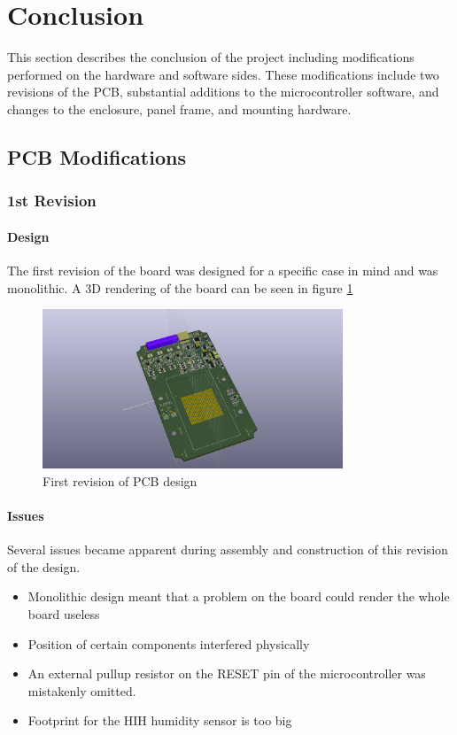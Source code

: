 \documentclass{article}
\numberwithin{figure}{section}
\numberwithin{equation}{section}
\begin{document}
{\section{Conclusion}\label{conclusion}
This section describes the conclusion of the project including modifications performed on the hardware and software sides. These modifications include two revisions of the PCB, substantial additions to the microcontroller software, and changes to the enclosure, panel frame, and mounting hardware.

\subsection{PCB Modifications}
\subsubsection{1st Revision}\label{conclusion-pcb-rev1}
\paragraph{Design}
The first revision of the board was designed for a specific case in mind and was monolithic. A 3D rendering of the board can be seen in figure \ref{fig:b1}
\begin{figure}[H]
	\centering
	\includegraphics[width=0.8\textwidth]{RFCxrev1_top}
	\caption{First revision of PCB design}
	\label{fig:b1}
\end{figure}

\paragraph{Issues}
Several issues became apparent during assembly and construction of this revision of the design. 
\begin{itemize}
\item Monolithic design meant that a problem on the board could render the whole board useless
\item Position of certain components interfered physically
\item An external pullup resistor on the RESET pin of the microcontroller was mistakenly omitted.
\item Footprint for the HIH humidity sensor is too big
\end{itemize}
}
\end{document}
